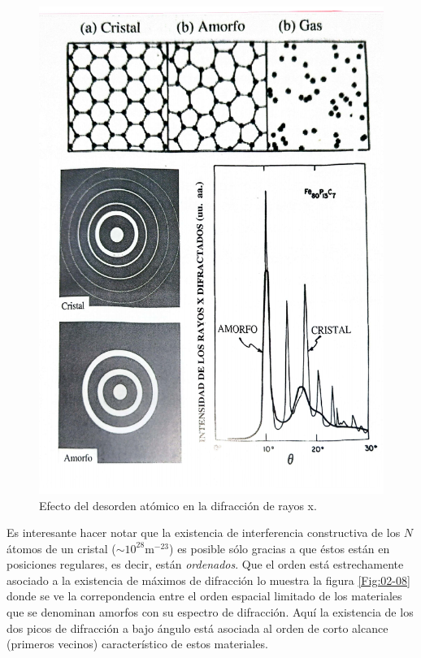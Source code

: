 \begin{figure}[h!] \centering
    \includegraphics[scale=0.45]{Cuerpo/Ch_02/Fotos_libro 9.pdf}
    \caption{Efecto del desorden atómico en la difracción de rayos x.}
    \label{Fig:02-09}
\end{figure}

Es interesante hacer notar que la existencia de interferencia constructiva de los $N$ átomos de un cristal ($\sim 10^{28} \text{m}^{-23}$) es posible sólo gracias a que éstos están en posiciones regulares, es decir, están \textit{ordenados}. Que el orden está estrechamente asociado a la existencia de máximos de difracción lo muestra la figura \ref{Fig:02-08} donde se ve la correpondencia entre el orden espacial limitado de los materiales que se denominan amorfos con su espectro de difracción. Aquí la existencia de los dos picos de difracción a bajo ángulo está asociada al orden de corto alcance (primeros vecinos) característico de estos materiales.